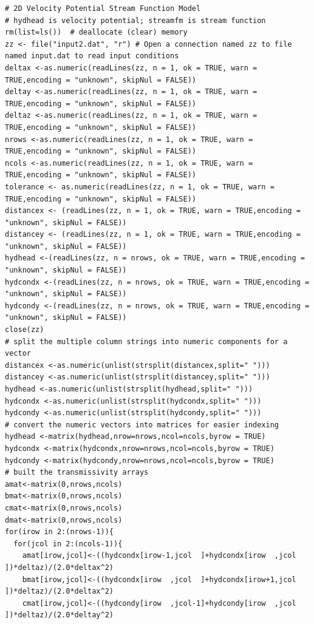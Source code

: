 \begin{lstlisting}[caption= Velocity Potential Script , label=lst:2DinclusionVelocity]
# 2D Velocity Potential Stream Function Model
# hydhead is velocity potential; streamfm is stream function
rm(list=ls())  # deallocate (clear) memory
zz <- file("input2.dat", "r") # Open a connection named zz to file named input.dat to read input conditions
deltax <-as.numeric(readLines(zz, n = 1, ok = TRUE, warn = TRUE,encoding = "unknown", skipNul = FALSE))
deltay <-as.numeric(readLines(zz, n = 1, ok = TRUE, warn = TRUE,encoding = "unknown", skipNul = FALSE))
deltaz <-as.numeric(readLines(zz, n = 1, ok = TRUE, warn = TRUE,encoding = "unknown", skipNul = FALSE))
nrows <-as.numeric(readLines(zz, n = 1, ok = TRUE, warn = TRUE,encoding = "unknown", skipNul = FALSE))
ncols <-as.numeric(readLines(zz, n = 1, ok = TRUE, warn = TRUE,encoding = "unknown", skipNul = FALSE))
tolerance <- as.numeric(readLines(zz, n = 1, ok = TRUE, warn = TRUE,encoding = "unknown", skipNul = FALSE))
distancex <- (readLines(zz, n = 1, ok = TRUE, warn = TRUE,encoding = "unknown", skipNul = FALSE))
distancey <- (readLines(zz, n = 1, ok = TRUE, warn = TRUE,encoding = "unknown", skipNul = FALSE))
hydhead <-(readLines(zz, n = nrows, ok = TRUE, warn = TRUE,encoding = "unknown", skipNul = FALSE))
hydcondx <-(readLines(zz, n = nrows, ok = TRUE, warn = TRUE,encoding = "unknown", skipNul = FALSE))
hydcondy <-(readLines(zz, n = nrows, ok = TRUE, warn = TRUE,encoding = "unknown", skipNul = FALSE))
close(zz)
# split the multiple column strings into numeric components for a vector
distancex <-as.numeric(unlist(strsplit(distancex,split=" ")))
distancey <-as.numeric(unlist(strsplit(distancey,split=" ")))
hydhead <-as.numeric(unlist(strsplit(hydhead,split=" ")))
hydcondx <-as.numeric(unlist(strsplit(hydcondx,split=" ")))
hydcondy <-as.numeric(unlist(strsplit(hydcondy,split=" ")))
# convert the numeric vectors into matrices for easier indexing
hydhead <-matrix(hydhead,nrow=nrows,ncol=ncols,byrow = TRUE)
hydcondx <-matrix(hydcondx,nrow=nrows,ncol=ncols,byrow = TRUE)
hydcondy <-matrix(hydcondy,nrow=nrows,ncol=ncols,byrow = TRUE)
# built the transmissivity arrays
amat<-matrix(0,nrows,ncols) 
bmat<-matrix(0,nrows,ncols) 
cmat<-matrix(0,nrows,ncols)
dmat<-matrix(0,nrows,ncols)
for(irow in 2:(nrows-1)){
  for(jcol in 2:(ncols-1)){
    amat[irow,jcol]<-((hydcondx[irow-1,jcol  ]+hydcondx[irow  ,jcol  ])*deltaz)/(2.0*deltax^2)
    bmat[irow,jcol]<-((hydcondx[irow  ,jcol  ]+hydcondx[irow+1,jcol  ])*deltaz)/(2.0*deltax^2)
    cmat[irow,jcol]<-((hydcondy[irow  ,jcol-1]+hydcondy[irow  ,jcol  ])*deltaz)/(2.0*deltay^2)

\end{lstlisting}

